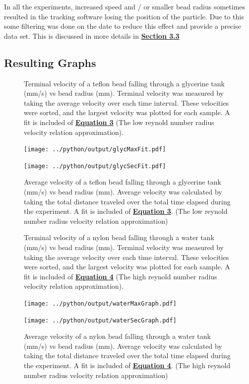 \documentclass[
	letterpaper
	12pt
]{template}
\newcommand{\bref}[2]{\textbf{\hyperref[#1]{#2}}}
\begin{document}
In all the experiments, increased speed and / or smaller bead radius sometimes resulted in the tracking software losing the position of the particle. Due to this some filtering was done on the date to reduce this effect and provide a precise data set. This is discussed in more details in \bref{filtering}{Section 3.3}
\subsection {Resulting Graphs}
\begin{figure}[H]
	\begin{minipage}[t]{0.45\textwidth}\label{terminalGlyc}
		\centering
		\caption{Terminal velocity of a teflon bead falling through a glycerine tank (mm/s) vs bead radius (mm). Terminal velocity was measured by taking the average velocity over each time interval. These velocities were sorted, and the largest velocity was plotted for each sample. A fit is included of \bref{lowReynold}{Equation 3} (The low reynold number radius velocity relation approximation).}
		\texttt{[image: ../python/output/glycMaxFit.pdf]}
	\end{minipage}
	\hfill
	\begin{minipage}[t]{0.45\textwidth}\label{avgGlyc}
		\centering
		\caption{Average velocity of a teflon bead falling through a glycerine tank (mm/s) vs bead radius (mm). Average velocity was calculated by taking the total distance traveled over the total time elapsed during the experiment. A fit is included of \bref{lowReynold}{Equation 3}. (The low reynold number radius velocity relation approximation)}
		\texttt{[image: ../python/output/glycSecFit.pdf]}
	\end{minipage}
\end{figure}

\begin{figure}[H]
	\begin{minipage}[t]{0.45\textwidth}\label{terminalWater}
		\centering
		\caption{Terminal velocity of a nylon bead falling through a water tank (mm/s) vs bead radius (mm). Terminal velocity was measured by taking the average velocity over each time interval. These velocities were sorted, and the largest velocity was plotted for each sample. A fit is included of \bref{highReynold}{Equation 4} (The high reynold number radius velocity relation approximation).}
		\texttt{[image: ../python/output/waterMaxGraph.pdf]}
	\end{minipage}
	\hfill
	\begin{minipage}[t]{0.45\textwidth}\label{averageWater}
		\centering
		\caption{Average velocity of a nylon bead falling through a water tank (mm/s) vs bead radius (mm). Average velocity was calculated by taking the total distance traveled over the total time elapsed during the experiment. A fit is included of \bref{highReynold}{Equation 4}. (The high reynold number radius velocity relation approximation)}
		\texttt{[image: ../python/output/waterSecGraph.pdf]}
	\end{minipage}
\end{figure}
\end{document}
